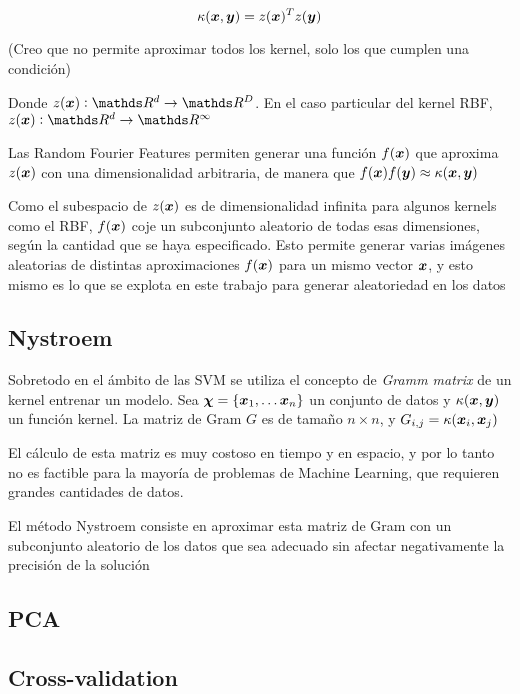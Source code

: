 \begin{equation}
 \kappa(\bm{x}, \bm{y}) = z(\bm{x})^Tz(\bm{y})
\end{equation}

(Creo que no permite aproximar todos los kernel, solo los que cumplen una condición)

Donde
$z(\vx) : \reals^d \rightarrow \reals^D$.
En el caso particular del
kernel RBF,
$z(\vx) : \reals^d \rightarrow \reals^\infty$

Las Random Fourier Features permiten generar una función $f(\bm{x})$ que aproxima $z(\bm{x})$
con una dimensionalidad arbitraria, de manera que
$f(\bm{x})f(\bm{y}) \approx \kappa(\bm{x}, \bm{y})$

Como el subespacio de $z(\bm{x})$ es de dimensionalidad infinita para algunos kernels
como el RBF, $f(\bm{x})$ coje un subconjunto aleatorio de todas esas dimensiones,
según la cantidad que se haya especificado. Esto permite generar varias imágenes
aleatorias de distintas aproximaciones $f(\bm{x})$ para un mismo vector $\bm{x}$, y esto
mismo es lo que se explota en este trabajo para generar aleatoriedad en los datos

\subsection{Nystroem}

Sobretodo en el ámbito de las SVM se utiliza el concepto de \textit{Gramm matrix}
de un kernel entrenar un modelo. Sea
$\bm{\chi} = \{\bm{x}_1, \ldots \bm{x}_n\}$
un conjunto de datos y
$\kappa(\bm{x}, \bm{y})$
un función kernel. La matriz de Gram $G$
es de tamaño $n \times n$, y
$G_{i,j} = \kappa(\bm{x}_i, \bm{x}_j)$

El cálculo de esta matriz es muy costoso en tiempo y en espacio, y por lo tanto
no es factible para la mayoría de problemas de Machine Learning, que requieren
grandes cantidades de datos.

El método Nystroem consiste en aproximar esta matriz de Gram con un subconjunto
aleatorio de los datos que sea adecuado sin afectar negativamente la precisión
de la solución
\subsection{PCA}
\subsection{Cross-validation}
